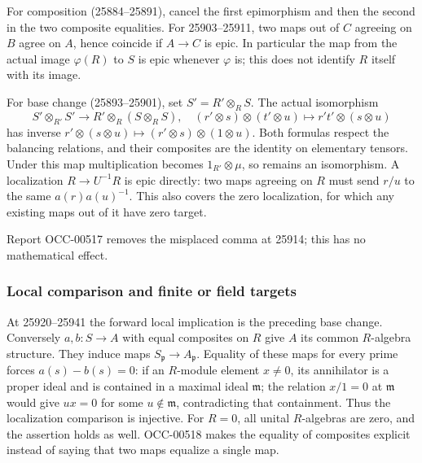 For composition (25884--25891), cancel the first epimorphism and then the second in the two composite equalities. For 25903--25911, two maps out of \(C\) agreeing on \(B\) agree on \(A\), hence coincide if \(A\to C\) is epic. In particular the map from the actual image \(\varphi(R)\) to \(S\) is epic whenever \(\varphi\) is; this does not identify \(R\) itself with its image.

For base change (25893--25901), set \(S'=R'\otimes_RS\). The actual isomorphism \[
S'\otimes_{R'}S'\longrightarrow R'\otimes_R(S\otimes_RS),
\quad (r'\otimes s)\otimes(t'\otimes u)\longmapsto r't'\otimes(s\otimes u)
\] has inverse \(r'\otimes(s\otimes u)\mapsto(r'\otimes s)\otimes(1\otimes u)\). Both formulas respect the balancing relations, and their composites are the identity on elementary tensors. Under this map multiplication becomes \(1_{R'}\otimes\mu\), so remains an isomorphism. A localization \(R\to U^{-1}R\) is epic directly: two maps agreeing on \(R\) must send \(r/u\) to the same \(a(r)a(u)^{-1}\). This also covers the zero localization, for which any existing maps out of it have zero target.

Report OCC-00517 removes the misplaced comma at 25914; this has no mathematical effect.

\subsubsection{Local comparison and finite or field targets}\label{local-comparison-and-finite-or-field-targets}

At 25920--25941 the forward local implication is the preceding base change. Conversely \(a,b:S\to A\) with equal composites on \(R\) give \(A\) its common \(R\)-algebra structure. They induce maps \(S_{\mathfrak p}\to A_{\mathfrak p}\). Equality of these maps for every prime forces \(a(s)-b(s)=0\): if an \(R\)-module element \(x\ne0\), its annihilator is a proper ideal and is contained in a maximal ideal \(\mathfrak m\); the relation \(x/1=0\) at \(\mathfrak m\) would give \(u x=0\) for some \(u\notin\mathfrak m\), contradicting that containment. Thus the localization comparison is injective. For \(R=0\), all unital \(R\)-algebras are zero, and the assertion holds as well. OCC-00518 makes the equality of composites explicit instead of saying that two maps equalize a single map.

